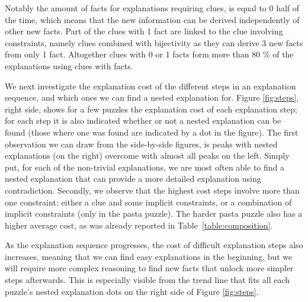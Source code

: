 Notably the amount of facts for explanations requiring clues, is equal to 0 half of the time, which means that the new information can 
be derived independently of other new facts. 
Part of the clues with 1 fact are linked to the clue involving constraints, namely clues combined with bijectivity as they can derive  3 new facts from only 1 fact.
Altogether clues with 0 or 1 facts form more than 80 \% of the explanations using clues with facts. 


We next investigate the explanation cost of the different steps in an explanation sequence, and which ones we can find a nested explanation for. 
Figure \ref{fig:steps}, right side, 
shows for a few puzzles the explanation cost of each explanation step; for each step it is also indicated whether or not a nested explanation can be found (those where one was found are indicated by a dot in the figure). 
The first observation we can draw from the side-by-side figures, is peaks with nested explanations (on the right) overcome with almost all peaks on the left. Simply put, for each of the non-trivial explanations, we are most often able to find a nested explanation that can provide a more detailed explanation using contradiction. 
Secondly, we observe that the highest cost steps involve more than one constraint: either a clue and some implicit constraints, or a combination of implicit constraints (only in the pasta puzzle). 
The harder pasta puzzle also has a higher average cost, as was already reported in Table~\ref{table:composition}. 

As the explanation sequence progresses, the cost of difficult explanation steps also increases, meaning that we can find easy explanations in the beginning, but we will require more complex reasoning to find new facts that unlock more simpler steps afterwards. 
This is especially visible from the trend line that fits all each puzzle's nested explanation dots on the right side of Figure \ref{fig:steps}. 

